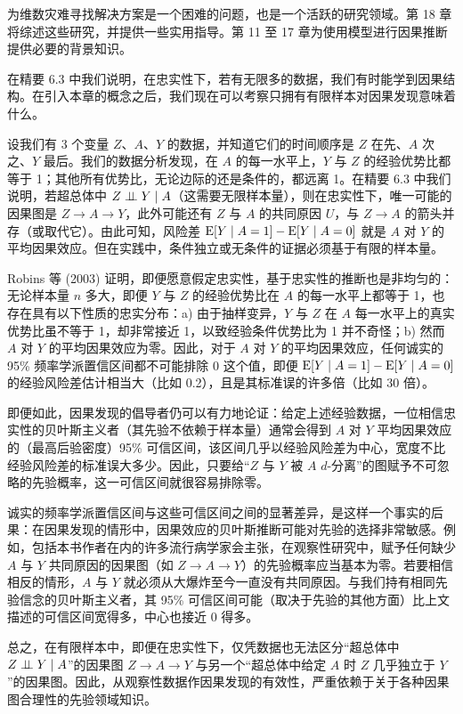
为维数灾难寻找解决方案是一个困难的问题，也是一个活跃的研究领域。第 18 章将综述这些研究，并提供一些实用指导。第 11 至 17 章为使用模型进行因果推断提供必要的背景知识。

\begin{techpoint}[随机变异对因果发现的影响]
在精要 6.3 中我们说明，在忠实性下，若有无限多的数据，我们有时能学到因果结构。在引入本章的概念之后，我们现在可以考察只拥有有限样本对因果发现意味着什么。

设我们有 3 个变量 $Z$、$A$、$Y$ 的数据，并知道它们的时间顺序是 $Z$ 在先、$A$ 次之、$Y$ 最后。我们的数据分析发现，在 $A$ 的每一水平上，$Y$ 与 $Z$ 的经验优势比都等于 1；其他所有优势比，无论边际的还是条件的，都远离 1。在精要 6.3 中我们说明，若超总体中 $Z\perp\!\!\!\perp Y\mid A$（这需要无限样本量），则在忠实性下，唯一可能的因果图是 $Z\to A\to Y$，此外可能还有 $Z$ 与 $A$ 的共同原因 $U$，与 $Z\to A$ 的箭头并存（或取代它）。由此可知，风险差 $\mathrm{E}[Y\mid A=1]-\mathrm{E}[Y\mid A=0]$ 就是 $A$ 对 $Y$ 的平均因果效应。但在实践中，条件独立或无条件的证据必须基于有限的样本量。

Robins 等 (2003) 证明，即便愿意假定忠实性，基于忠实性的推断也是非均匀的：无论样本量 $n$ 多大，即便 $Y$ 与 $Z$ 的经验优势比在 $A$ 的每一水平上都等于 1，也存在具有以下性质的忠实分布：a) 由于抽样变异，$Y$ 与 $Z$ 在 $A$ 每一水平上的真实优势比虽不等于 1，却非常接近 1，以致经验条件优势比为 1 并不奇怪；b) 然而 $A$ 对 $Y$ 的平均因果效应为零。因此，对于 $A$ 对 $Y$ 的平均因果效应，任何诚实的 95\% 频率学派置信区间都不可能排除 0 这个值，即便 $\mathrm{E}[Y\mid A=1]-\mathrm{E}[Y\mid A=0]$ 的经验风险差估计相当大（比如 0.2），且是其标准误的许多倍（比如 30 倍）。

即便如此，因果发现的倡导者仍可以有力地论证：给定上述经验数据，一位相信忠实性的贝叶斯主义者（其先验不依赖于样本量）通常会得到 $A$ 对 $Y$ 平均因果效应的（最高后验密度）95\% 可信区间，该区间几乎以经验风险差为中心，宽度不比经验风险差的标准误大多少。因此，只要给“$Z$ 与 $Y$ 被 $A$ $d$-分离”的图赋予不可忽略的先验概率，这一可信区间就很容易排除零。

诚实的频率学派置信区间与这些可信区间之间的显著差异，是这样一个事实的后果：在因果发现的情形中，因果效应的贝叶斯推断可能对先验的选择非常敏感。例如，包括本书作者在内的许多流行病学家会主张，在观察性研究中，赋予任何缺少 $A$ 与 $Y$ 共同原因的因果图（如 $Z\to A\to Y$）的先验概率应当基本为零。若要相信相反的情形，$A$ 与 $Y$ 就必须从大爆炸至今一直没有共同原因。与我们持有相同先验信念的贝叶斯主义者，其 95\% 可信区间可能（取决于先验的其他方面）比上文描述的可信区间宽得多，中心也接近 0 得多。

总之，在有限样本中，即便在忠实性下，仅凭数据也无法区分“超总体中 $Z\perp\!\!\!\perp Y\mid A$”的因果图 $Z\to A\to Y$ 与另一个“超总体中给定 $A$ 时 $Z$ 几乎独立于 $Y$”的因果图。因此，从观察性数据作因果发现的有效性，严重依赖于关于各种因果图合理性的先验领域知识。
\end{techpoint}
